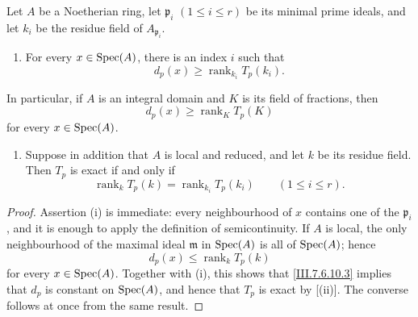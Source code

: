 \begin{corollary}[7.6.10]
\label{III.7.6.10}
Let $A$ be a Noetherian ring, let
$\mathfrak p_i$ $(1\leq i\leq r)$ be its minimal prime
ideals, and let $k_i$ be the residue field of
$A_{\mathfrak p_i}$.
\begin{enumerate}
  \item[(i)] For every $x\in\operatorname{Spec}(A)$, there is an index $i$
    such that
    \[
      d_p(x)\geq
      \operatorname{rank}_{k_i}T_p(k_i).
      \tag{7.6.10.1}\label{III.7.6.10.1}
    \]
\end{enumerate}
In particular, if $A$ is an integral domain and $K$ is its
field of fractions, then
\[
  d_p(x)\geq\operatorname{rank}_K T_p(K)
  \tag{7.6.10.2}\label{III.7.6.10.2}
\]
for every $x\in\operatorname{Spec}(A)$.

\begin{enumerate}
  \item[(ii)] Suppose in addition that $A$ is local and
    reduced, and let $k$ be its residue field.  Then $T_p$ is
    exact if and only if
    \[
      \operatorname{rank}_k T_p(k)
      =
      \operatorname{rank}_{k_i}T_p(k_i)
      \qquad(1\leq i\leq r).
      \tag{7.6.10.3}\label{III.7.6.10.3}
    \]
\end{enumerate}
\end{corollary}

\begin{proof}
Assertion \textnormal{(i)} is immediate: every neighbourhood
of $x$ contains one of the $\mathfrak p_i$, and it is enough
to apply the definition of semicontinuity.  If $A$ is local,
the only neighbourhood of the maximal ideal $\mathfrak m$ in
$\operatorname{Spec}(A)$ is all of $\operatorname{Spec}(A)$; hence
\[
  d_p(x)\leq\operatorname{rank}_k T_p(k)
\]
for every $x\in\operatorname{Spec}(A)$.  Together with \textnormal{(i)},
this shows that \eqref{III.7.6.10.3} implies that $d_p$ is
constant on $\operatorname{Spec}(A)$, and hence that $T_p$ is exact by
[(ii)].  The converse follows at once from
the same result.
\end{proof}

\egaIIISubsectionSevenSixEleven
